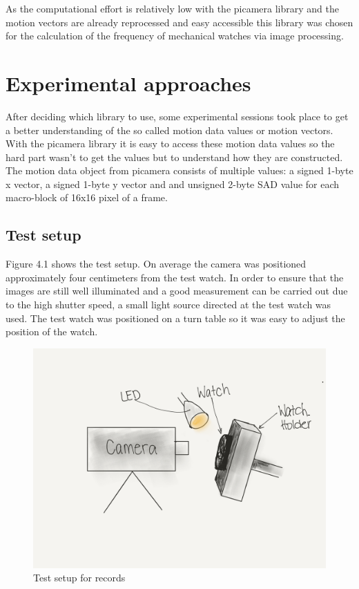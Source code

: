 \documentclass[12pt, a4paper]{report}
\begin{document}
    As the computational effort is relatively low with the picamera library and the motion vectors are already reprocessed and easy accessible this library was chosen for the calculation of the frequency of mechanical watches via image processing.

    \chapter {Experimental approaches}

    After deciding which library to use, some experimental sessions took place to get a better understanding of the so called motion data values or motion vectors. 
    With the picamera library it is easy to access these motion data values so the hard part wasn't to get the values but to understand how they are constructed. 
    The motion data object from picamera consists of multiple values: a signed 1-byte x vector, a signed 1-byte y vector and and unsigned 2-byte SAD value for each macro-block of 16x16 pixel of a frame.
    
   \section{Test setup}
   
Figure 4.1 shows the test setup. On average the camera was positioned approximately four centimeters from the test watch. In order to ensure that the images are still well illuminated and a good measurement can be carried out due to the high shutter speed, a small light source directed at the test watch was used. The test watch was positioned on a turn table so it was easy to adjust the position of the watch.

      \begin{figure}[H]
        \centering
        \includegraphics[scale=0.3]{Images/test_setup}
        
        \caption{Test setup for records}
        \end{figure}
        
\end{document}
